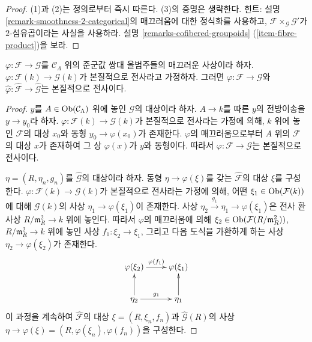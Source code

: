\begin{proof}
(1)과 (2)는 정의로부터 즉시 따른다. (3)의 증명은 생략한다.
힌트: 설명 \ref{remark-smoothness-2-categorical}의 매끄러움에 대한
정식화를 사용하고, $\mathcal{F} \times_\mathcal{G} \mathcal{G}'$가
$2$-섬유곱이라는 사실을 사용하라. 설명
\ref{remarks-cofibered-groupoids} (\ref{item-fibre-product})을 보라.
\end{proof}

\begin{lemma}
\label{lemma-smooth-morphism-essentially-surjective}
$\varphi : \mathcal{F} \to \mathcal{G}$를 $\mathcal{C}_\Lambda$ 위의
준군값 쌍대 올범주들의 매끄러운 사상이라 하자.
$\varphi : \mathcal{F}(k) \to \mathcal{G}(k)$가 본질적으로
전사라고 가정하자. 그러면 $\varphi : \mathcal{F} \to \mathcal{G}$와
$\widehat{\varphi} : \widehat{\mathcal{F}} \to \widehat{\mathcal{G}}$는
본질적으로 전사이다.
\end{lemma}

\begin{proof}
$y$를 $A \in \mathop{\mathrm{Ob}}\nolimits(\mathcal{C}_\Lambda)$ 위에 놓인
$\mathcal{G}$의 대상이라 하자. $A \to k$를 따른 $y$의 전방이송을
$y \to y_0$라 하자. $\varphi : \mathcal{F}(k) \to \mathcal{G}(k)$가
본질적으로 전사라는 가정에 의해, $k$ 위에 놓인 $\mathcal{F}$의 대상
$x_0$와 동형 $y_0 \to \varphi(x_0)$가 존재한다. $\varphi$의
매끄러움으로부터 $A$ 위의 $\mathcal{F}$의 대상 $x$가 존재하여
그 상 $\varphi(x)$가 $y$와 동형이다. 따라서
$\varphi : \mathcal{F} \to \mathcal{G}$는 본질적으로 전사이다.

\medskip\noindent
$\eta = (R, \eta_n, g_n)$를 $\widehat{\mathcal{G}}$의 대상이라 하자.
동형 $\eta \to \varphi(\xi)$를 갖는 $\widehat{\mathcal{F}}$의 대상
$\xi$를 구성한다. $\varphi : \mathcal{F}(k) \to \mathcal{G}(k)$가
본질적으로 전사라는 가정에 의해, 어떤
$\xi_1 \in \mathop{\mathrm{Ob}}\nolimits(\mathcal{F}(k))$에 대해 $\mathcal{G}(k)$의 사상
$\eta_1 \to \varphi(\xi_1)$이 존재한다. 사상
$\eta_2 \xrightarrow{g_1} \eta_1 \to \varphi(\xi_1)$은 전사 환 사상
$R/\mathfrak m_R^2 \to k$ 위에 놓인다. 따라서 $\varphi$의
매끄러움에 의해 $\xi_2 \in \mathop{\mathrm{Ob}}\nolimits(\mathcal{F}(R/\mathfrak m_R^2))$,
$R/\mathfrak m_R^2 \to k$ 위에 놓인 사상
$f_1: \xi_2 \to \xi_1$, 그리고 다음 도식을 가환하게 하는 사상
$\eta_2 \to \varphi(\xi_2)$가 존재한다.
$$
\xymatrix{
\varphi(\xi_2)  \ar[r]^{\varphi(f_1)} &  \varphi(\xi_{1})   \\
\eta_2   \ar[u] \ar[r]^{g_1}  & \eta_1  \ar[u] \\
}
$$
이 과정을 계속하여 $\widehat{\mathcal{F}}$의 대상
$\xi = (R, \xi_n, f_n)$과 $\widehat{\mathcal{G}}(R)$의 사상
$\eta \to \varphi(\xi) = (R, \varphi(\xi_n), \varphi(f_n))$을 구성한다.
\end{proof}

